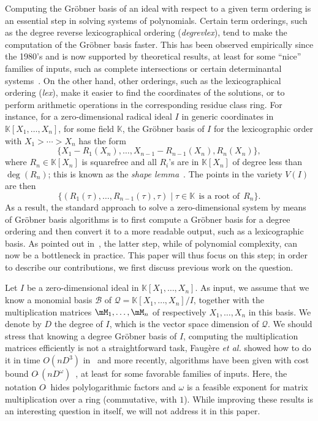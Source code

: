 \documentclass[12pt]{article}
\newcommand{\basis}{\mathscr{B}}
\newcommand{\softO}[1]{O{\tilde{~}}(#1)} %
\newcommand{\residueI}{\mathscr{Q}}
\def\K{\mathbb{K}}
\def\K {\ensuremath{\mathbb{K}}}
\begin{document}
Computing the Gr\"obner basis of an ideal with respect to a given
term ordering is an essential step in solving systems of polynomials.
Certain term orderings, such as the degree reverse lexicographical
ordering (\textit{degrevlex}), tend to make the computation of the
Gr\"obner basis faster. This has been observed empirically since the
1980's and is now supported by theoretical results, at least for some
``nice'' families of inputs, such as complete intersections or certain
determinantal systems~\cite{Faugere02,FaSaSp13,BaFaSa15}.  On the
other hand, other orderings, such as the lexicographical ordering
(\textit{lex}), make it easier to find the coordinates of the
solutions, or to perform arithmetic operations in the corresponding
residue class ring.  For instance, for a zero-dimensional radical
ideal $I$ in generic coordinates in $\K[X_1,\dots,X_n]$, for some field $\K$,
the Gr\"obner basis of $I$ for the lexicographic order with $X_1 > \cdots > X_n$
has the form
\begin{equation}\label{eq:shapelemma}
 \{ X_1 - R_1(X_n),\dots, X_{n-1}-R_{n-1}(X_n),R_n(X_n)\},
\end{equation}
where $R_n \in \K[X_n]$ is squarefree and all $R_i$'s are in $\K[X_n]$
of degree less than $\deg(R_n)$; this is known as the {\em shape
  lemma}~\cite{GiMo89}. The points in the variety $V(I)$ are then
  $$\{ ( R_1(\tau), \dots, R_{n-1}(\tau), \tau ) \mid \tau \in \K
  \;\,\text{is a root of}\;\, R_n\}.$$ As a result, the standard approach to
 solve a zero-dimensional system by means of Gr\"obner basis
 algorithms is to first compute a Gr\"obner basis for a degree ordering
 and then convert it to a more readable output, such as a lexicographic
 basis. As pointed out in~\cite{FaMo17}, the latter step, while of
 polynomial complexity, can now be a bottleneck in practice. This
 paper will thus focus on this step; in order to describe our 
 contributions, we first discuss previous work on the question.

 Let $I$ be a zero-dimensional ideal in $\K[X_1,\dots,X_n]$.  As
 input, we assume that we know a monomial basis $\basis$ of
 $\residueI=\K[X_1,\dots,X_n]/I$, together with the multiplication matrices
 $\mM_1,\dots,\mM_n$ of respectively $X_1,\dots,X_n$ in this basis. We
 denote by $D$ the degree of $I$, which is the vector space dimension
 of $\residueI$. We should stress that knowing a degree Gr\"obner basis of
 $I$, computing the multiplication matrices efficiently is not a
 straightforward task, Faug\`ere {\it et al.} showed how to do it in
 time $O(nD^3)$ in~\cite{FaGiLaMo93} and more recently, algorithms have
 been given with cost bound
 $\softO{nD^\omega}$~\cite{FaGaHuRe13,FaGaHuRe14,Neiger16}, at
 least for some favorable families of inputs. Here, the notation
 $O\tilde{~}$ hides polylogarithmic factors and $\omega$ is a feasible
 exponent for matrix multiplication over a ring (commutative, with $1$). While
 improving these results is an interesting question in itself, we will not
 address it in this paper.
\end{document}
